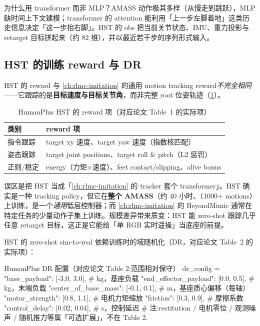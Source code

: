 为什么用 transformer 而非 MLP？AMASS 动作极其多样（从慢走到跳跃），MLP 缺时间上下文建模；transformer 的 attention 能利用「上一步左脚着地」这类历史信息决定「这一步抬右脚」。HST 的 obs 把当前关节状态、IMU、重力投影与 retarget 目标拼起来（约 82 维），并以最近若干步的序列形式输入。

\subsection{HST 的训练 reward 与 DR}
\label{sec:rlmc-mm-humanplus-reward}

HST 的 reward 与 \cref{ch:rlmc-imitation} 的通用 motion tracking reward\emph{不完全相同}——它跟踪的是\textbf{目标速度与目标关节角}，而非完整 root 位姿轨迹（\cref{tab:rlmc-mm-hst-reward}）。

\begin{table}[ht]
\centering
\small
\caption{HumanPlus HST 的 reward 项（对应论文 Table~1 的实际项）}
\label{tab:rlmc-mm-hst-reward}
\begin{tabular}{@{}lp{6.4cm}@{}}
\toprule
类别 & reward 项 \\
\midrule
指令跟踪 & target xy 速度、target yaw 速度（指数核匹配） \\
姿态跟踪 & target joint positions、target roll \& pitch（L2 惩罚） \\
正则/稳定 & energy（力矩$\times$速度）、feet contact/slipping、alive bonus \\
\bottomrule
\end{tabular}
\end{table}

\begin{insight}\label{ins:rlmc-mm-hst-general}
误区是把 HST 当成「\cref{ch:rlmc-imitation} 的 tracker 套个 transformer」。HST 确实是一种 tracking policy，但它在\textbf{整个 AMASS}（约 40 小时、11000+ motions）上训练，是一个\emph{通用}低层控制器；而 \cref{ch:rlmc-imitation} 的 BeyondMimic 通常在特定任务的少量动作子集上训练。规模差异带来质变：HST 能 zero-shot 跟踪几乎任意 retarget 目标，这正是它能给「单 RGB 实时遥操」当底座的前提。
\end{insight}

HST 的 zero-shot sim-to-real 依赖训练时的域随机化（DR，对应论文 Table~2 的实际项）：

\begin{codebox}[Python]{HumanPlus DR 配置（对应论文 Table 2;范围相对保守）}
dr_config = {
    "base_payload":         [-3.0, 3.0],    # kg，基座负载
    "end_effector_payload": [0.0, 0.5],     # kg，末端负载
    "center_of_base_mass":  [-0.1, 0.1],    # m，基座质心偏移（每轴）
    "motor_strength":       [0.8, 1.1],     # 电机力矩缩放
    "friction":             [0.3, 0.9],     # 摩擦系数
    "control_delay":        [0.02, 0.04],   # s，控制延迟
}
# 注:restitution / 电机零位 / 观测噪声 / 随机推力等属「可选扩展」，不在 Table 2.
\end{codebox}

